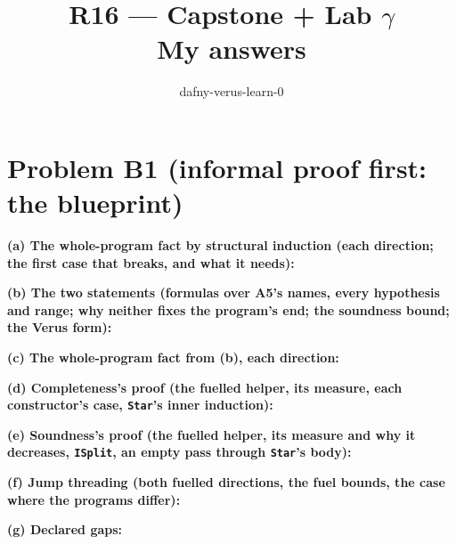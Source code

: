 \documentclass[11pt]{article}
\title{R16 --- Capstone + Lab $\gamma$ \\ \large My answers}
\author{dafny-verus-learn-0}
\date{}
\begin{document}
\maketitle
\sloppy
\section*{Problem B1 (informal proof first: the blueprint)}\label{ans:B1}
\begin{answer}
\textbf{(a) The whole-program fact by structural induction (each direction; the
first case that breaks, and what it needs):} \vspace{2cm}

\textbf{(b) The two statements (formulas over A5's names, every hypothesis and
range; why neither fixes the program's end; the soundness bound; the Verus
form):} \vspace{3cm}

\textbf{(c) The whole-program fact from (b), each direction:} \vspace{1.5cm}

\textbf{(d) Completeness's proof (the fuelled helper, its measure, each
constructor's case, \texttt{Star}'s inner induction):} \vspace{3cm}

\textbf{(e) Soundness's proof (the fuelled helper, its measure and why it
decreases, \texttt{ISplit}, an empty pass through \texttt{Star}'s body):}
\vspace{3cm}

\textbf{(f) Jump threading (both fuelled directions, the fuel bounds, the case
where the programs differ):} \vspace{2cm}

\textbf{(g) Declared gaps:} \vspace{1cm}
\end{answer}
\end{document}
